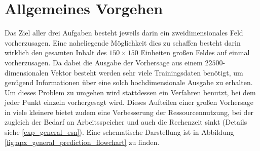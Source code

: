 \section{Allgemeines Vorgehen}
\label{sc:experiments_general}
Das Ziel aller drei Aufgaben besteht jeweils darin ein zweidimensionales Feld vorherzusagen. Eine naheliegende Möglichkeit dies zu schaffen besteht darin wirklich den gesamten Inhalt des $150 \times 150$ Einheiten großen Feldes auf einmal vorherzusagen. Da dabei die Ausgabe der Vorhersage aus einem $22500$-dimensionalen Vektor besteht werden sehr viele Trainingsdaten benötigt, um genügend Informationen über eine solch hochdimensionale Ausgabe zu erhalten. Um dieses Problem zu umgehen wird stattdessen ein Verfahren benutzt, bei dem jeder Punkt einzeln vorhergesagt wird. Dieses Aufteilen einer großen Vorhersage in viele kleinere bietet zudem eine Verbesserung der Ressourcennutzung, bei der zugleich der Bedarf an Arbeitsspeicher und auch die Rechenzeit sinkt (Details siehe \ref{exp_general_esn}). Eine schematische Darstellung ist in Abbildung \ref{fig:apx_general_prediction_flowchart} zu finden.\\

